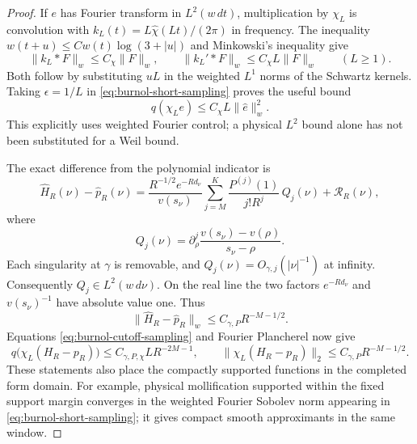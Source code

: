 \begin{proof}
If $e$ has Fourier transform in $L^2(w\,dt)$, multiplication
by $\chi_L$ is convolution with
$k_L(t)=L\widehat\chi(Lt)/(2\pi)$ in frequency.
The inequality
$w(t+u)\le Cw(t)\log(3+|u|)$ and Minkowski's inequality give
\[
 \|k_L*F\|_w\le C_\chi\|F\|_w,\qquad
 \|k_L'*F\|_w\le C_\chi L\|F\|_w
 \qquad(L\ge1).
\]
Both follow by substituting $uL$ in the weighted $L^1$
norms of the Schwartz kernels. Taking $\epsilon=1/L$ in
\eqref{eq:burnol-short-sampling} proves the useful bound
\begin{equation}\label{eq:burnol-cutoff-sampling}
 q(\chi_Le)\le C_\chi L\|\widehat e\|_w^2.
\end{equation}
This explicitly uses weighted Fourier control; a physical
$L^2$ bound alone has not been substituted for a Weil bound.

The exact difference from the polynomial indicator is
\begin{equation}\label{eq:burnol-poly-error}
 \widehat H_R(\nu)-\widehat p_R(\nu)
 =\frac{R^{-1/2}e^{-Rd_\nu}}{v(s_\nu)}
 \sum_{j=M}^K\frac{P^{(j)}(1)}{j!R^j}\,Q_j(\nu)
       +\mathcal R_R(\nu),
\end{equation}
where
\[
 Q_j(\nu)=\partial_\rho^j
             \frac{v(s_\nu)-v(\rho)}{s_\nu-\rho}.
\]
Each singularity at $\gamma$ is removable, and
$Q_j(\nu)=O_{\gamma,j}(|\nu|^{-1})$ at infinity.
Consequently $Q_j\in L^2(w\,d\nu)$. On the real line the
two factors $e^{-Rd_\nu}$ and $v(s_\nu)^{-1}$ have absolute
value one. Thus
\[
 \|\widehat H_R-\widehat p_R\|_w
       \le C_{\gamma,P}R^{-M-1/2}.
\]
Equations \eqref{eq:burnol-cutoff-sampling} and Fourier
Plancherel now give
\begin{equation}\label{eq:burnol-two-cutoff-errors}
 q\bigl(\chi_L(H_R-p_R)\bigr)
       \le C_{\gamma,P,\chi}L R^{-2M-1},\qquad
 \|\chi_L(H_R-p_R)\|_2
       \le C_{\gamma,P}R^{-M-1/2}.
\end{equation}
These statements also place the compactly supported
functions in the completed form domain. For example,
physical mollification supported within the fixed support
margin converges in the weighted Fourier Sobolev norm
appearing in \eqref{eq:burnol-short-sampling}; it gives
compact smooth approximants in the same window.


\end{proof}
